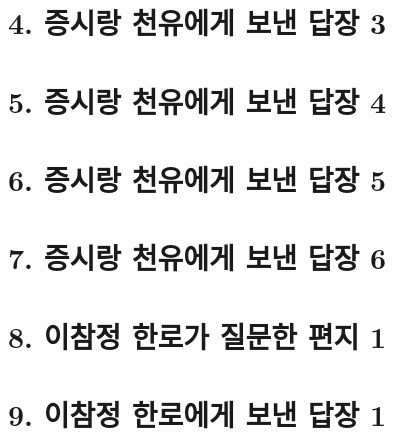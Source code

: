 \documentclass[12pt, a4paper, oneside]{book}
\let\stdsection\section
\renewcommand\section{\newpage\stdsection}
\begin{document}
%
	\section{4. 증시랑 천유에게 보낸 답장 3 }

%
	\section{5. 증시랑 천유에게 보낸 답장 4 }

%
	\section{6. 증시랑 천유에게 보낸 답장 5 }

%
	\section{7. 증시랑 천유에게 보낸 답장 6 }

%
	\section{8. 이참정 한로가 질문한 편지 1}

%
	\section{9. 이참정 한로에게 보낸 답장 1}

%
\end{document}
